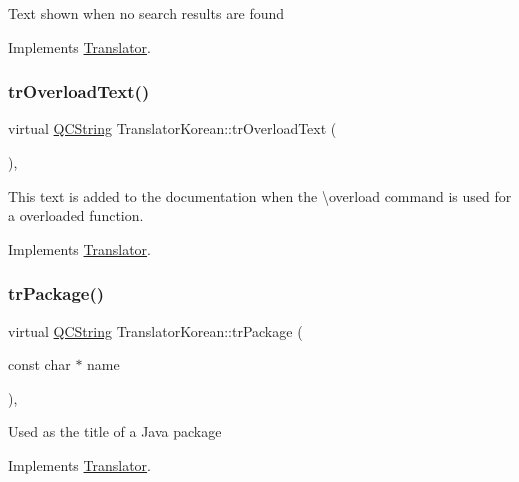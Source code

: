 Text shown when no search results are found 

Implements \mbox{\hyperlink{class_translator}{Translator}}.

\mbox{\label{class_translator_korean_a02a2526670077f9d12f2c16dd836e4ed}} 
\subsubsection{\texorpdfstring{trOverloadText()}{trOverloadText()}}
{\footnotesize\ttfamily virtual \mbox{\hyperlink{class_q_c_string}{Q\+C\+String}} Translator\+Korean\+::tr\+Overload\+Text (\begin{DoxyParamCaption}{ }\end{DoxyParamCaption})\hspace{0.3cm}{\ttfamily [inline]}, {\ttfamily [virtual]}}

This text is added to the documentation when the \textbackslash{}overload command is used for a overloaded function. 

Implements \mbox{\hyperlink{class_translator}{Translator}}.

\mbox{\label{class_translator_korean_a3f1264cb70c19c0dc66b421db2d98e6e}} 
\subsubsection{\texorpdfstring{trPackage()}{trPackage()}}
{\footnotesize\ttfamily virtual \mbox{\hyperlink{class_q_c_string}{Q\+C\+String}} Translator\+Korean\+::tr\+Package (\begin{DoxyParamCaption}\item[{const char $\ast$}]{name }\end{DoxyParamCaption})\hspace{0.3cm}{\ttfamily [inline]}, {\ttfamily [virtual]}}

Used as the title of a Java package 

Implements \mbox{\hyperlink{class_translator}{Translator}}.

\mbox{\label{class_translator_korean_a8559c442e96678b90b5f70fff31d92f8}} 
